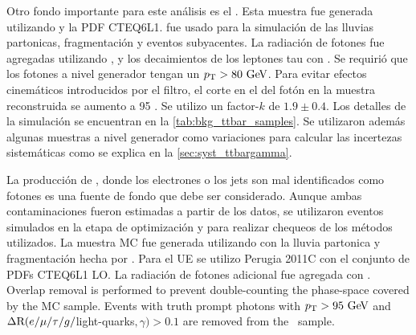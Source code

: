 Otro fondo importante para este análisis es el {\ttgam}. Esta muestra fue
generada utilizando {\madgraph}\cite{Alwall:2007st} y la PDF CTEQ6L1.
{\pythiasix}\cite{pythia} fue usado para la simulación de las lluvias
partonicas, fragmentación y eventos subyacentes. La radiación de fotones fue
agregadas utilizando {\photos}\cite{photos}, y los decaimientos de los leptones
tau con {\tauola}\cite{tauola}. Se requirió que los fotones a nivel generador
tengan un $\pt > 80 \gev$. Para evitar efectos cinemáticos introducidos por el
filtro, el corte en el {\pt} del fotón en la muestra reconstruida se aumento a
95 {\gev}. Se utilizo un factor-$k$ de $1.9 \pm 0.4$\cite{Melnikov:2011ta, tth}.
Los detalles de la simulación se encuentran en la \cref{tab:bkg_ttbar_samples}.
Se utilizaron además algunas muestras a nivel generador como variaciones para calcular
las incertezas sistemáticas como se explica en la \cref{sec:syst_ttbargamma}.

La producción de {\ttbar}, donde los electrones o los jets son mal identificados
como fotones es una fuente de fondo que debe ser considerado. Aunque ambas
contaminaciones fueron estimadas a partir de los datos, se utilizaron eventos simulados
en la etapa de optimización y para realizar chequeos de los métodos utilizados.
La
muestra MC fue generada utilizando
{\powheg}\cite{Nason:2004rx,Frixione:2007vw,Alioli:2010xd} con la lluvia
partonica y fragmentación hecha por {\pythia}. Para el UE se utilizo Perugia
2011C con el
conjunto de PDFs CTEQ6L1 LO. La radiación de fotones adicional fue agregada con
{\photos}\cite{photos}. Overlap removal is performed to prevent double-counting
the phase-space covered by the {\ttgam} MC sample. Events with truth prompt
photons with $\pt > 95 \gev$ and $\Delta{\rm R}(e/\mu/\tau/g/$light-quarks$,
\gamma) > 0.1$ are removed from the \ttbar\ sample.


